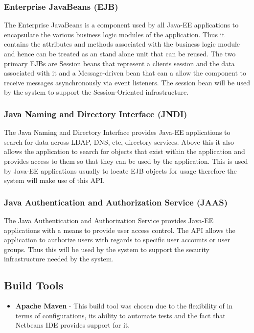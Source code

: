 \documentclass[12pt]{article}
\begin{document}
\subsubsection{Enterprise JavaBeans (EJB)}
The Enterprise JavaBeans is a component used by all Java-EE applications to encapsulate the various business logic modules of the application. Thus it contains the attributes and methods associated with the business logic module and hence can be treated as an stand alone unit that can be reused. The two primary EJBs are Session beans that represent a clients session and the data associated with it and a Message-driven bean that can a allow the component to receive messages asynchronously via event listeners. The session bean will be used by the system to support the Session-Oriented infrastructure.  

\subsubsection{Java Naming and Directory Interface (JNDI)}
The Java Naming and Directory Interface provides Java-EE applications to search for data across LDAP, DNS, etc, directory services. Above this it also allows the application to search for objects that exist within the application and provides access to them so that they can be used by the application. This is used by Java-EE applications usually to locate EJB objects for usage therefore the system will make use of this API.

\subsubsection{Java Authentication and Authorization Service (JAAS)}
The Java Authentication and Authorization Service provides Java-EE applications with a means to provide user access control. The API allows the application to authorize users with regards to specific user accounts or user groups. Thus this will be used by the system to support the security infrastructure needed by the system.

\subsection*{Build Tools}
\begin{itemize}
\item \textbf{Apache Maven} - This build tool was chosen due to the flexibility of in terms of configurations, its ability to automate tests and the fact that Netbeans IDE provides support for it. 
\end{itemize}
\end{document}

